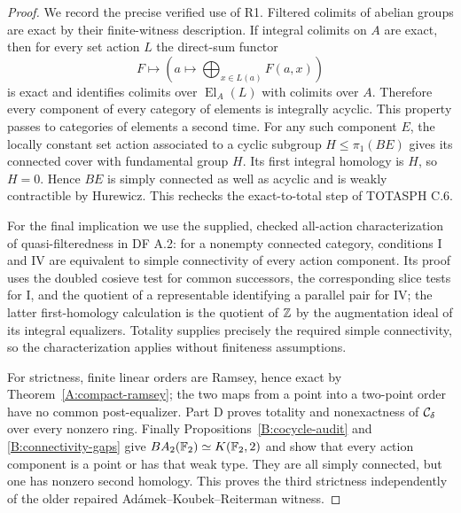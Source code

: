 \begin{proof}
We record the precise verified use of R1. Filtered colimits of abelian
groups are exact by their finite-witness description. If integral
colimits on $A$ are exact, then for every set action $L$ the direct-sum
functor
\[
 F\longmapsto\left(a\longmapsto\bigoplus_{x\in L(a)}F(a,x)\right)
\]
is exact and identifies colimits over $\operatorname{El}_A(L)$ with
colimits over $A$. Therefore every component of every category of
elements is integrally acyclic. This property passes to categories of
elements a second time. For any such component $E$, the locally
constant set action associated to a cyclic subgroup
$H\leq\pi_1(BE)$ gives its connected cover with fundamental group
$H$. Its first integral homology is $H$, so $H=0$. Hence $BE$ is
simply connected as well as acyclic and is weakly contractible by
Hurewicz. This rechecks the exact-to-total step of TOTASPH C.6.

For the final implication we use the supplied, checked all-action
characterization of quasi-filteredness in DF A.2: for a nonempty
connected category, conditions I and IV are equivalent to simple
connectivity of every action component. Its proof uses the doubled
cosieve test for common successors, the corresponding slice tests
for I, and the quotient of a representable identifying a parallel
pair for IV; the latter first-homology calculation is the quotient
of $\mathbb Z$ by the augmentation ideal of its integral equalizers.
Totality supplies precisely the required simple connectivity, so
the characterization applies without finiteness assumptions.

For strictness, finite linear orders are Ramsey, hence exact by
Theorem~\ref{A:compact-ramsey}; the two maps from a point into a
two-point order have no common post-equalizer. Part D proves
totality and nonexactness of $\mathcal C_\delta$ over every nonzero ring.
Finally Propositions~\ref{B:cocycle-audit} and
\ref{B:connectivity-gaps} give $BA_2(\mathbb F_2)\simeq K(\mathbb F_2,2)$ and
show that every action component is a point or has that weak type.
They are all simply connected, but one has nonzero second homology.
This proves the third strictness independently of the older repaired
Ad\'amek--Koubek--Reiterman witness.
\end{proof}

